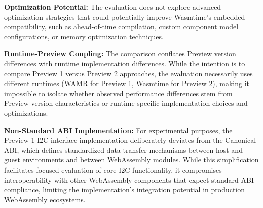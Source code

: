 \textbf{Optimization Potential:} The evaluation does not explore advanced optimization strategies that could potentially improve Wasmtime's embedded compatibility, such as ahead-of-time compilation, custom component model configurations, or memory optimization techniques.

\textbf{Runtime-Preview Coupling:} The comparison conflates Preview version differences with runtime implementation differences. While the intention is to compare Preview 1 versus Preview 2 approaches, the evaluation necessarily uses different runtimes (WAMR for Preview 1, Wasmtime for Preview 2), making it impossible to isolate whether observed performance differences stem from Preview version characteristics or runtime-specific implementation choices and optimizations.

\textbf{Non-Standard ABI Implementation:} For experimental purposes, the Preview 1 I2C interface implementation deliberately deviates from the Canonical ABI, which defines standardized data transfer mechanisms between host and guest environments and between WebAssembly modules. While this simplification facilitates focused evaluation of core I2C functionality, it compromises interoperability with other WebAssembly components that expect standard ABI compliance, limiting the implementation's integration potential in production WebAssembly ecosystems.



















